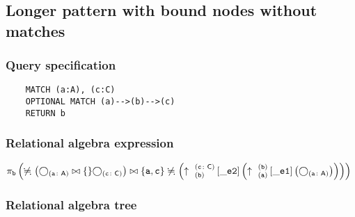 	\subsection{Longer pattern with bound nodes without matches}

	\subsubsection*{Query specification}

	\begin{lstlisting}
	MATCH (a:A), (c:C)
	OPTIONAL MATCH (a)-->(b)-->(c)
	RETURN b
	\end{lstlisting}


	\subsubsection*{Relational algebra expression}

	$\projection{\var{b}} \left(\alldifferent{} \left(\getvertices{a}{A} \join \{\} \getvertices{c}{C}\right) \join \{\var{a}, \var{c}\} \alldifferent{} \left(\expandout{b}{c}{C}{\_e2}{} \left(\expandout{a}{b}{}{\_e1}{} \left(\getvertices{a}{A}\right)\right)\right)\right)$

	\subsubsection*{Relational algebra tree}


